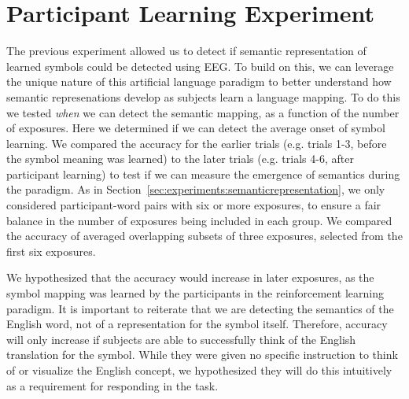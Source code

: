 \section{Participant Learning Experiment}
\label{sec:experiments:participantlearning}
The previous experiment allowed us to detect if semantic representation of 
learned symbols could be detected using EEG. To build on this, we can leverage 
the unique nature of this artificial language paradigm to better understand how 
semantic represenations develop as subjects learn a language mapping. To do 
this we tested \emph{when} we can detect the semantic mapping, as a function of 
the number of exposures.  Here we determined if we can detect the average onset 
of symbol learning. We compared the \tvt accuracy for the earlier trials (e.g.  
trials 1-3, before the symbol meaning was learned) to the later trials (e.g.  
trials 4-6, after participant learning) to test if we can measure the emergence 
of semantics during the paradigm. As in 
Section~\ref{sec:experiments:semanticrepresentation}, we only considered 
participant-word pairs with six or more exposures, to ensure a fair balance in 
the number of exposures being included in each group. We compared the \tvt 
accuracy of averaged overlapping subsets of three exposures, selected from the 
first six exposures.

We hypothesized that the \tvt accuracy would increase in later exposures, as 
the symbol mapping was learned by the participants in the reinforcement 
learning paradigm. It is important to reiterate that we are detecting the 
semantics of the English word, not of a representation for the symbol itself.  
Therefore, accuracy will only increase if subjects are able to successfully 
think of the English translation for the symbol. While they were given no 
specific instruction to think of or visualize the English concept, we 
hypothesized they will do this intuitively as a requirement for responding in 
the task.
